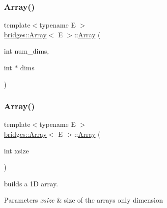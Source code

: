 \mbox{\label{classbridges_1_1_array_a25ff771f9ba7f365465f309ed2dd3688}} 
\subsubsection{\texorpdfstring{Array()}{Array()}\hspace{0.1cm}{\footnotesize\ttfamily [2/6]}}
{\footnotesize\ttfamily template$<$typename E $>$ \\
\mbox{\hyperlink{classbridges_1_1_array}{bridges\+::\+Array}}$<$ E $>$\+::\mbox{\hyperlink{classbridges_1_1_array}{Array}} (\begin{DoxyParamCaption}\item[{int}]{num\+\_\+dims,  }\item[{int $\ast$}]{dims }\end{DoxyParamCaption})\hspace{0.3cm}{\ttfamily [inline]}}

\mbox{\label{classbridges_1_1_array_a0a475058b73b938f0fd3f577365aca89}} 
\subsubsection{\texorpdfstring{Array()}{Array()}\hspace{0.1cm}{\footnotesize\ttfamily [3/6]}}
{\footnotesize\ttfamily template$<$typename E $>$ \\
\mbox{\hyperlink{classbridges_1_1_array}{bridges\+::\+Array}}$<$ E $>$\+::\mbox{\hyperlink{classbridges_1_1_array}{Array}} (\begin{DoxyParamCaption}\item[{int}]{xsize }\end{DoxyParamCaption})\hspace{0.3cm}{\ttfamily [inline]}}

builds a 1D array. 
\begin{DoxyParams}{Parameters}
{\em xsize} & size of the array\textquotesingle{}s only dimension \\
\hline
\end{DoxyParams}
\mbox{\label{classbridges_1_1_array_a13b26fc4d2ccb19b277b2acc615efce2}} 

